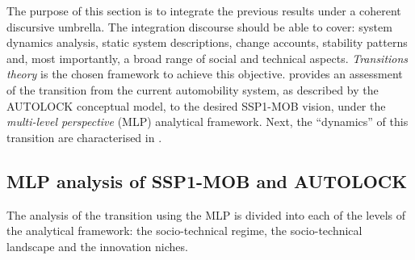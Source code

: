 %
%
%
The purpose of this section is to integrate the previous results under a coherent discursive umbrella. The integration discourse should be able to cover: system dynamics analysis, static system descriptions, change accounts, stability patterns and, most importantly, a broad range of social and technical aspects. \emph{Transitions theory} is the chosen framework to achieve this objective.  provides an assessment of the transition from the current automobility system, as described by the AUTOLOCK conceptual model, to the desired SSP1-MOB vision, under the \emph{multi-level perspective} (MLP) analytical framework. Next, the ``dynamics'' of this transition are characterised in .

\subsection{MLP analysis of SSP1-MOB and AUTOLOCK}
\label{ss:results:transition_mlp}
%
The analysis of the transition using the MLP is divided into each of the levels of the analytical framework: the socio-technical regime, the socio-technical landscape and the innovation niches.

